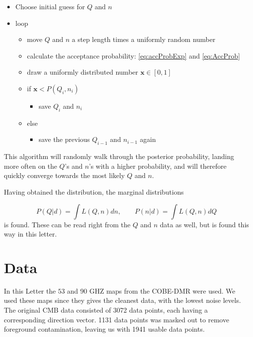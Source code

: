 \documentclass{emulateapj}
\begin{document}
\begin{itemize}
\item Choose initial guess for $Q$ and $n$
\item loop
    \begin{itemize}
     \item move $Q$ and $n$ a step length times a uniformly random number
     \item calculate the acceptance probability: \eqref{eq:accProbExp} and \eqref{eq:AccProb}
     \item draw a uniformly distributed number $\mathbf{x}\in[0,1]$
     \item if $\mathbf{x} < P(Q_i,n_i)$
     \begin{itemize}
     \item save $Q_i$ and $n_i$
     \end{itemize}
     \item else
     \begin{itemize}
     \item save the previous $Q_{i-1}$ and $n_{i-1}$ again
     \end{itemize}
     \end{itemize}
\end{itemize}

This algorithm will randomly walk through the posterior probability, landing more often on the $Q$'s and $n$'s with a higher probability, and will therefore quickly converge towards the most likely $Q$ and $n$.

Having obtained the distribution, the marginal distributions

\begin{equation}
P(Q|d) = \int L(Q,n)dn , \qquad P(n|d) = \int L(Q,n)dQ
\end{equation}
is found. These can be read right from the $Q$ and $n$ data as well, but is found this way in this letter.





%
%

\section{Data}
\label{sec:data}

In this Letter the $53$ and $90$ GHZ maps from the COBE-DMR were used. We used these maps since they gives the cleanest data, with the lowest noise levels. The original CMB data consisted of 3072 data points, each having a corresponding direction vector. 1131 data points was masked out to remove foreground contamination, leaving us with 1941 usable data points.
\end{document}
